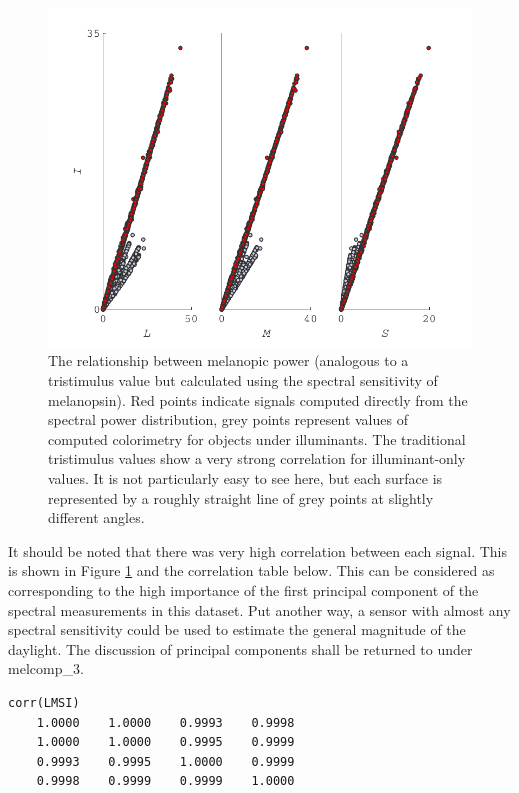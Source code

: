 \begin{figure}[htbp]
    \includegraphics[max width=\textwidth]{figs/comp/melcomp_1/correlationBetweenLevel1Sigs.pdf}
    \caption{The relationship between melanopic power (analogous to a tristimulus value but calculated using the spectral sensitivity of melanopsin). Red points indicate signals computed directly from the spectral power distribution, grey points represent values of computed colorimetry for objects under illuminants.  The traditional tristimulus values show a very strong correlation for illuminant-only values. It is not particularly easy to see here, but each surface is represented by a roughly straight line of grey points at slightly different angles.}
    \label{fig:tristimCorrelation}
\end{figure} 

It should be noted that there was very high correlation between each signal. This is shown in Figure \ref{fig:tristimCorrelation} and the correlation table below. This can be considered as corresponding to the high importance of the first principal component of the spectral measurements in this dataset. Put another way, a sensor with almost any spectral sensitivity could be used to estimate the general magnitude of the daylight. The discussion of principal components shall be returned to under melcomp\_3.

\begin{lstlisting}
corr(LMSI)
    1.0000    1.0000    0.9993    0.9998
    1.0000    1.0000    0.9995    0.9999
    0.9993    0.9995    1.0000    0.9999
    0.9998    0.9999    0.9999    1.0000
\end{lstlisting}

